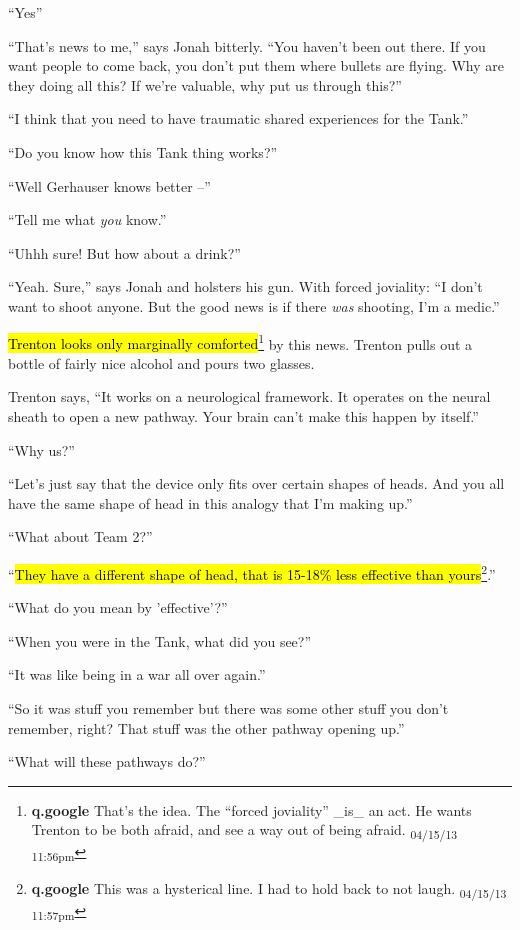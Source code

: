 ``Yes''

``That's news to me,'' says Jonah bitterly.  ``You haven't been out there.  If you want people to come back, you don't put them where bullets are flying.  Why are they doing all this?  If we're valuable, why put us through this?''

``I think that you need to have traumatic shared experiences for the Tank.''

``Do you know how this Tank thing works?''

``Well Gerhauser knows better --''

``Tell me what \textit{you} know.''

``Uhhh sure!  But how about a drink?''

``Yeah.  Sure,'' says Jonah and holsters his gun.  With forced joviality: ``I don't want to shoot anyone.  But the good news is if there \textit{was} shooting, I'm a medic.''

\hl{Trenton looks only marginally comforted}\footnote{\textbf{q.google }That's the idea.  The ``forced joviality'' \_is\_ an act.  He wants Trenton to be both afraid, and see a way out of being afraid. \textsubscript{04/15/13 11:56pm}} by this news.  Trenton pulls out a bottle of fairly nice alcohol and pours two glasses.

Trenton says, ``It works on a neurological framework.  It operates on the neural sheath to open a new pathway.  Your brain can't make this happen by itself.''

``Why us?''

``Let's just say that the device only fits over certain shapes of heads.  And you all have the same shape of head in this analogy that I'm making up.''

``What about Team 2?''

``\hl{They have a different shape of head, that is 15-18\% less effective than yours}\footnote{\textbf{q.google }This was a hysterical line.  I had to hold back to not laugh. \textsubscript{04/15/13 11:57pm}}.''

``What do you mean by 'effective'?''

``When you were in the Tank, what did you see?''

``It was like being in a war all over again.''

``So it was stuff you remember but there was some other stuff you don't remember, right?  That stuff was the other pathway opening up.''

``What will these pathways do?''

